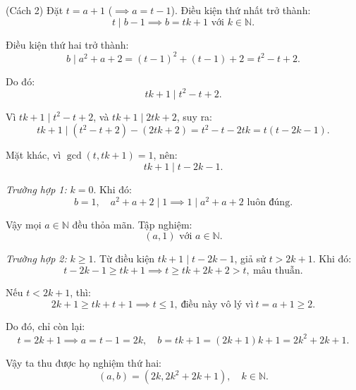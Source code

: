 \documentclass[../01-divisibility.tex]{subfiles}
\begin{document}
\begin{soln}(Cách 2)\footnotemark
	Đặt $t = a + 1$ ($\implies a = t - 1$). Điều kiện thứ nhất trở thành:
	\[
		t \mid b - 1 \implies b = tk + 1 \text{ với } k \in \mathbb{N}.
	\]

	Điều kiện thứ hai trở thành:
	\[
		b \mid a^2 + a + 2 = (t - 1)^2 + (t - 1) + 2 = t^2 - t + 2.
	\]
	
	Do đó:
	\[
		tk + 1 \mid t^2 - t + 2.
	\]
	
	Vì $tk + 1 \mid t^2 - t + 2$, và $tk + 1 \mid 2tk + 2$, suy ra:
	\[
		tk + 1 \mid (t^2 - t + 2) - (2tk + 2) = t^2 - t - 2tk = t(t - 2k - 1).
	\]
	
	Mặt khác, vì $\gcd(t, tk + 1) = 1$, nên:
	\[
		tk + 1 \mid t - 2k - 1.
	\]

	\textit{Trường hợp 1:} $k = 0$.
	Khi đó:
	\[
		b = 1, \quad a^2 + a + 2 \mid 1 \implies 1 \mid a^2 + a + 2 \text{ luôn đúng}.
	\]

	Vậy mọi $a \in \mathbb{N}$ đều thỏa mãn. Tập nghiệm:
	\[
		\boxed{(a, 1) \text{ với } a \in \mathbb{N}}.
	\]

	\textit{Trường hợp 2:} $k \ge 1$.
	Từ điều kiện $tk + 1 \mid t - 2k - 1$, giả sử $t > 2k + 1$. Khi đó:
	\[
		t - 2k - 1 \ge tk + 1 \implies t \ge tk + 2k + 2 > t,\ \text{mâu thuẫn.}
	\]
	
	Nếu $t < 2k + 1$, thì:
	\[
		2k + 1 \ge tk + t + 1 \implies t \le 1,\ \text{điều này vô lý vì}\ t = a + 1 \ge 2.
	\]
	
	Do đó, chỉ còn lại:
	\[
		t = 2k + 1 \implies a = t - 1 = 2k, \quad b = tk + 1 = (2k + 1)k + 1 = 2k^2 + 2k + 1.
	\]

	Vậy ta thu được họ nghiệm thứ hai:
	\[
		\boxed{(a, b) = (2k, 2k^2 + 2k + 1), \quad k \in \mathbb{N}}.
	\]
\end{soln}

\end{document}
